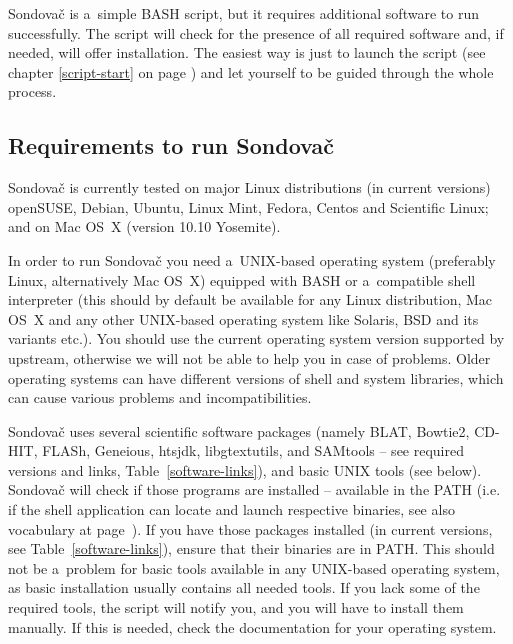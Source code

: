 \documentclass[a4paper, 11pt, twoside]{article}
\begin{document}
Sondovač is a~simple BASH script, but it requires additional software to run successfully. The script will check for the presence of all required software and, if needed, will offer installation. The easiest way is just to launch the script (see chapter \ref{script-start} on page \pageref{script-start}) and let yourself to be guided through the whole process.

\subsection{Requirements to run Sondovač}

Sondovač is currently tested on major Linux distributions (in current versions) openSUSE, Debian, Ubuntu, Linux Mint, Fedora, Centos and Scientific Linux; and on Mac OS~X (version 10.10 Yosemite).

In order to run Sondovač you need a~UNIX-based operating system (preferably Linux, alternatively Mac OS~X) equipped with BASH or a~compatible shell interpreter (this should by default be available for any Linux distribution, Mac OS~X and any other UNIX-based operating system like Solaris, BSD and its variants etc.). You should use the current operating system version supported by upstream, otherwise we will not be able to help you in case of problems. Older operating systems can have different versions of shell and system libraries, which can cause various problems and incompatibilities.

Sondovač uses several scientific software packages (namely BLAT, Bowtie2, CD-HIT, FLASh, Geneious, htsjdk, libgtextutils, and SAMtools -- see required versions and links, Table~\ref{software-links}), and basic UNIX tools (see below). Sondovač will check if those programs are installed -- available in the PATH (i.e. if the shell application can locate and launch respective binaries, see also vocabulary at page~\pageref{vocabulary}). If you have those packages installed (in current versions, see Table~\ref{software-links}), ensure that their binaries are in PATH. This should not be a~problem for basic tools available in any UNIX-based operating system, as basic installation usually contains all needed tools. If you lack some of the required tools, the script will notify you, and you will have to install them manually. If this is needed, check the documentation for your operating system.
\end{document}
